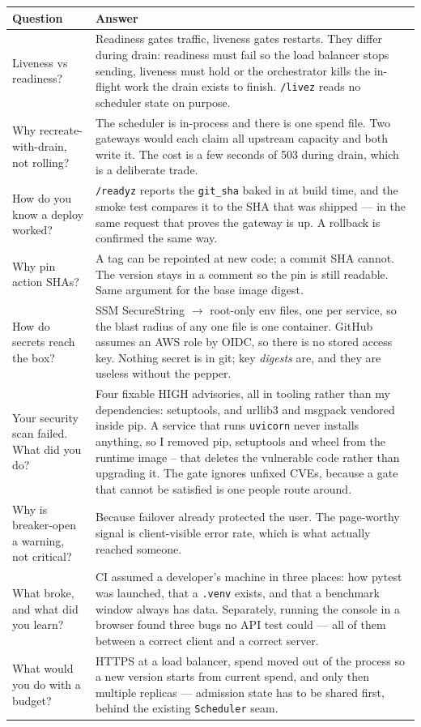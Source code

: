\documentclass[10pt,a4paper]{article}
\begin{document}
\begin{tabularx}{\textwidth}{@{}p{54mm}X@{}}
\toprule
\textbf{Question} & \textbf{Answer} \\
\midrule
Liveness vs readiness? &
  Readiness gates traffic, liveness gates restarts. They differ during drain:
  readiness must fail so the load balancer stops sending, liveness must hold
  or the orchestrator kills the in-flight work the drain exists to finish.
  \texttt{/livez} reads no scheduler state on purpose. \\
Why recreate-with-drain, not rolling? &
  The scheduler is in-process and there is one spend file. Two gateways would
  each claim all upstream capacity and both write it. The cost is a few
  seconds of 503 during drain, which is a deliberate trade. \\
How do you know a deploy worked? &
  \texttt{/readyz} reports the \texttt{git\_sha} baked in at build time, and
  the smoke test compares it to the SHA that was shipped — in the same request
  that proves the gateway is up. A rollback is confirmed the same way. \\
Why pin action SHAs? &
  A tag can be repointed at new code; a commit SHA cannot. The version stays
  in a comment so the pin is still readable. Same argument for the base image
  digest. \\
How do secrets reach the box? &
  SSM SecureString $\rightarrow$ root-only env files, one per service, so the
  blast radius of any one file is one container. GitHub assumes an AWS role by
  OIDC, so there is no stored access key. Nothing secret is in git; key
  \emph{digests} are, and they are useless without the pepper. \\
Your security scan failed. What did you do? &
  Four fixable HIGH advisories, all in tooling rather than my dependencies:
  setuptools, and urllib3 and msgpack vendored inside pip. A service that
  runs \texttt{uvicorn} never installs anything, so I removed pip,
  setuptools and wheel from the runtime image -- that deletes the vulnerable
  code rather than upgrading it. The gate ignores unfixed CVEs, because a
  gate that cannot be satisfied is one people route around. \\
Why is breaker-open a warning, not critical? &
  Because failover already protected the user. The page-worthy signal is
  client-visible error rate, which is what actually reached someone. \\
What broke, and what did you learn? &
  CI assumed a developer's machine in three places: how pytest was launched,
  that a \texttt{.venv} exists, and that a benchmark window always has data.
  Separately, running the console in a browser found three bugs no API test
  could — all of them between a correct client and a correct server. \\
What would you do with a budget? &
  HTTPS at a load balancer, spend moved out of the process so a new version
  starts from current spend, and only then multiple replicas — admission state
  has to be shared first, behind the existing \texttt{Scheduler} seam. \\
\bottomrule
\end{tabularx}
\end{document}
